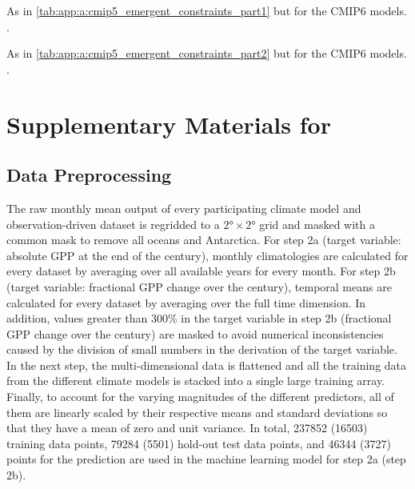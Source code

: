 \begin{table}[p]
  \centering
  \caption{As in \cref{tab:app:a:cmip5_emergent_constraints_part1} but for the
    \acs{CMIP}6 models. .}
  \label{tab:app:a:cmip6_emergent_constraints_part1}
\end{table}

\begin{table}[p]
  \centering
  \caption{As in \cref{tab:app:a:cmip5_emergent_constraints_part2} but for the
  \acs{CMIP}6 models. .}
  \label{tab:app:a:cmip6_emergent_constraints_part2}
\end{table}


\section{Supplementary Materials for
  \texorpdfstring{}{Chapter \ref{ch:06:paper_gpp}}}
\label{sec:app:si_for_paper_gpp}


\subsection{Data Preprocessing}
\label{subsec:app:b:data_preprocessing}

The raw monthly mean output of every participating climate model and
observation-driven dataset is regridded to a $\ang{2} \times \ang{2}$ grid and
masked with a common mask to remove all oceans and Antarctica. For step 2a
(target variable: absolute \acf{GPP} at the end of the  century),
monthly climatologies are calculated for every dataset by averaging over all
available years for every month. For step 2b (target variable: fractional
\ac{GPP} change over the  century), temporal means are calculated for
every dataset by averaging over the full time dimension. In addition, values
greater than $300 \unit{\%}$ in the target variable in step 2b (fractional
\ac{GPP} change over the  century) are masked to avoid numerical
inconsistencies caused by the division of small numbers in the derivation of
the target variable. In the next step, the multi-dimensional data is flattened
and all the training data from the different climate models is stacked into a
single large training array. Finally, to account for the varying magnitudes of
the different predictors, all of them are linearly scaled by their respective
means and standard deviations so that they have a mean of zero and unit
variance. In total, 237852 (16503) training data points, 79284 (5501) hold-out
test data points, and 46344 (3727) points for the prediction are used in the
machine learning model for step 2a (step 2b).


